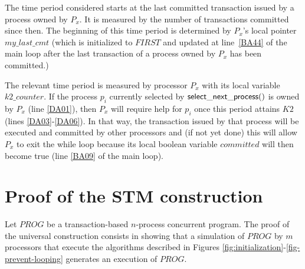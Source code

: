 The time period considered starts at the last committed transaction 
issued  by a  process owned  by $P_x$. It  is  measured by  the  number of
transactions committed since then.  The beginning of this time period is
determined by  $P_x$'s local pointer $my\_last\_cmt$
(which   is initialized to $\mathit{FIRST}$
and updated at  line~\ref{BA44} of the main loop after the last transaction
of a process  owned by $P_x$  has been committed.) 


The relevant time period is measured by processor $P_x$ with  its local 
variable  $k2\_counter$.  If the process $p_i$ currently selected by 
${\sf select\_next\_process}()$ is owned by $P_x$ (line \ref{DA01}),
then $P_x$ will require help for $p_i$ once this period attains $K2$
(lines \ref{DA03}-\ref{DA06}). In that way, the transaction 
issued by that process will be executed and committed by other processors
and (if not yet done) this will  allow $P_x$ to exit the while loop because
its  local  boolean   variable  $committed$  will then  become  true  (line
\ref{BA09} of  the main loop).  


\section{Proof of the STM  construction}
\label{sec:proof}

Let $\mathit{PROG}$ be a transaction-based $n$-process concurrent program. 
The proof of the universal construction consists in showing that a  
simulation of $\mathit{PROG}$ by $m$ processors that execute the algorithms 
described in Figures \ref{fig:initialization}-\ref{fig-prevent-looping}
generates an execution of  $\mathit{PROG}$. 




